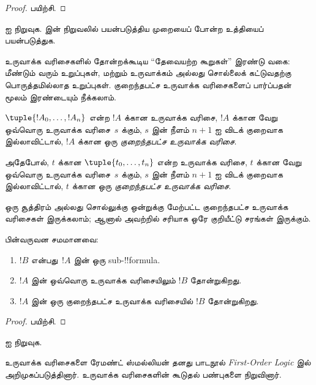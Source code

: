 \documentclass[../../../include/open-logic-section]{subfiles}
\begin{document}
\begin{proof}
பயிற்சி.
\end{proof}

\begin{prob}
 ஐ நிறுவுக.
 இன் நிறுவலில் பயன்படுத்திய
முறையைப் போன்ற உத்தியைப் பயன்படுத்துக.
\end{prob}

உருவாக்க வரிசைகளில் தோன்றக்கூடிய ``தேவையற்ற கூறுகள்'' இரண்டு வகை:
மீண்டும் வரும் உறுப்புகள், மற்றும் உருவாக்கம் அல்லது சொல்லைக் கட்டுவதற்கு
பொருத்தமில்லாத உறுப்புகள். குறைந்தபட்ச உருவாக்க வரிசைகளைப் பார்ப்பதன் மூலம்
இரண்டையும் நீக்கலாம்.

\begin{defn}[குறைந்தபட்ச உருவாக்க வரிசைகள்]
$\tuple{!A_0, \ldots, !A_n}$ என்ற $!A$ க்கான உருவாக்க வரிசை,
$!A$ க்கான வேறு ஒவ்வொரு உருவாக்க வரிசை~$s$ க்கும், $s$ இன் நீளம் $n+1$ ஐ விடக்
குறைவாக இல்லாவிட்டால், $!A$ க்கான ஒரு \emph{குறைந்தபட்ச உருவாக்க வரிசை}.

அதேபோல், $t$ க்கான $\tuple{t_0, \ldots, t_n}$ என்ற உருவாக்க வரிசை,
$t$ க்கான வேறு ஒவ்வொரு உருவாக்க வரிசை~$s$ க்கும், $s$ இன் நீளம் $n+1$ ஐ விடக்
குறைவாக இல்லாவிட்டால், $t$ க்கான ஒரு \emph{குறைந்தபட்ச உருவாக்க வரிசை}.
\end{defn}

ஒரு சூத்திரம் அல்லது சொல்லுக்கு ஒன்றுக்கு மேற்பட்ட குறைந்தபட்ச உருவாக்க
வரிசைகள் இருக்கலாம்; ஆனால் அவற்றில் சரியாக ஒரே குறியீட்டு சரங்கள் இருக்கும்.

\begin{prop}
பின்வருவன சமமானவை:
\begin{enumerate}
    \item $!B$ என்பது~$!A$ இன் ஒரு sub-!!{formula}.
    \item $!A$ இன் ஒவ்வொரு உருவாக்க வரிசையிலும் $!B$ தோன்றுகிறது.
    \item $!A$ இன் ஒரு குறைந்தபட்ச உருவாக்க வரிசையில் $!B$ தோன்றுகிறது.
\end{enumerate}
\end{prop}

\begin{proof}
பயிற்சி.
\end{proof}

\begin{prob}
 ஐ நிறுவுக.
\end{prob}

\begin{history}
உருவாக்க வரிசைகளை ரேமண்ட் ஸ்மல்லியன் தனது பாடநூல்
\emph{First-Order Logic} \citep{Smullyan1968} இல் அறிமுகப்படுத்தினார்.
உருவாக்க வரிசைகளின் கூடுதல் பண்புகளை \citet{Zuckerman1973} நிறுவினார்.
\end{history}
\end{document}
